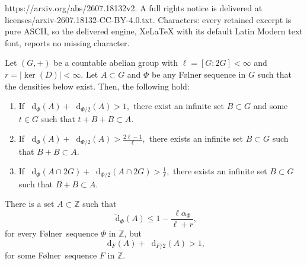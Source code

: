 \documentclass[10pt,a4paper]{amsart}
\newcommand{\Folner}{F\o{}lner}
\def\Z{{\mathbb Z}}
\newcommand*\diff{\mathop{}\!\mathrm{d}}
\begin{document}
https://arxiv.org/abs/2607.18132v2. A full rights notice is delivered at licenses/arxiv-2607.18132-CC-BY-4.0.txt. Characters: every retained excerpt is pure ASCII, so the delivered engine, XeLaTeX with its default Latin Modern text font, reports no missing character.
\begin{theorem}\label{main theorem}
Let $(G,+)$ be a countable abelian group with $\ell=[G:2G]<\infty$ and $r=|\ker(D)|<\infty$. Let $A\subset G$ and $\Phi$ be any \Folner{} sequence in $G$ such that the densities below exist. Then, the following hold:
\begin{enumerate}
\item  \label{main_theorem_1_2}
If 
$\diff_\Phi(A)+ \diff_{\Phi/2}(A)> 1,$
there exist an infinite set $B\subset G$ and some $t\in G$ such that 
$t+B+B\subset A$. 
\item  \label{main_theorem_1_1} 
\vspace{2mm} 
If 
$\diff_\Phi(A) + \diff_{\Phi/2}(A)> \frac{2\ell-1}{\ell},$
there exists an infinite set $B\subset G$ such that $B+B\subset A$. 
\item   \label{main_theorem_evens}  \vspace{2mm} If 
$ \diff_\Phi(A\cap 2G)+\diff_{\Phi/2}(A\cap 2G) > \frac{1}{\ell},$
there exists an infinite set $B\subset G$ such that $B+B\subset A$.
\end{enumerate}    
\end{theorem}

\begin{proposition}\label{no reverse implication of main theorems}
There is a set 
$A\subset \Z$ such that 
$$\overline{\diff}_{\Phi}(A) \leq 1-\frac{\ell \alpha_{\Phi}}{\ell+r},$$
for every \Folner\ sequence $\Phi$ in $\Z$, but 
$$\diff_{F}(A)+\diff_{F/2}(A)>1, $$
for some \Folner\ sequence $F$ in $\Z$.
\end{proposition}
\end{document}
